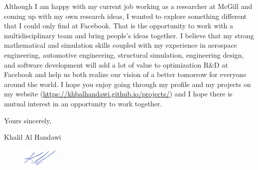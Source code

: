 \documentclass[12pt]{article} %
\begin{document}
\medskip %

Although I am happy with my current job working as a researcher at McGill and coming up with my own research ideas, I wanted to explore something different that I could only find at Facebook. That is the opportunity to work with a multidisciplinary team and bring people's ideas together. I believe that my strong mathematical and simulation skills coupled with my experience in aerospace engineering, automotive engineering, structural simulation, engineering design, and software development will add a lot of value to optimization R\&D at Facebook and help us both realize our vision of a better tomorrow for everyone around the world. I hope you enjoy going through my profile and my projects on my website (\href{https://khbalhandawi.github.io/projects/}{https://khbalhandawi.github.io/projects/}) and I hope there is mutual interest in an opportunity to work together.

\medskip %

Yours sincerely,

\medskip %

Khalil Al Handawi

\begin{figure}[h]
	\includegraphics[width=0.15\textwidth]{Signiture.png}
\end{figure}

\medskip %

\end{document}
